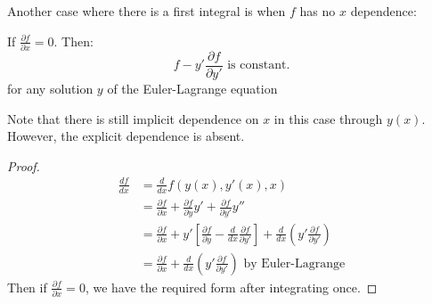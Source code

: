 \documentclass[../Main.tex]{subfiles}
\begin{document}
Another case where there is a first integral is when $f$ has no $x$ dependence:
\begin{proposition}
    If $\frac{\partial f}{\partial x} = 0$. Then:
    \begin{equation}
        f - y' \frac{\partial f}{\partial y'} \text{ is constant.}
        \label{eqnFirstIntegral2}
    \end{equation}
    for any solution $y$ of the Euler-Lagrange equation
    \label{propFirstIntegral}
\end{proposition}
\begin{remark}
    Note that there is still implicit dependence on $x$ in this case through $y(x)$. However, the explicit dependence is absent.
\end{remark}
\begin{proof}
    \begin{align*}
        \frac{df}{dx} &= \frac{d}{dx} f(y(x), y'(x), x) \\
        &= \frac{\partial f}{\partial x} + \frac{\partial f}{\partial y}y' + \frac{\partial f}{\partial y'} y'' \\
        &= \frac{\partial f}{\partial x} + y'\left[\frac{\partial f}{\partial y} - \frac{d}{dx} \frac{\partial f}{\partial y'}\right] + \frac{d}{dx} \left(y' \frac{\partial f}{\partial y'}\right) \\
        &= \frac{\partial f}{\partial x} + \frac{d}{dx} \left(y' \frac{\partial f}{\partial y'}\right) \text{ by Euler-Lagrange}
    \end{align*}
    Then if $\frac{\partial f}{\partial x} = 0$, we have the required form after integrating once.
\end{proof}
\end{document}
